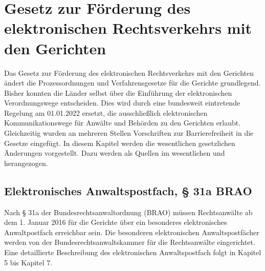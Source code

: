 \section{Gesetz zur Förderung des elektronischen Rechtsverkehrs mit den Gerichten}
Das Gesetz zur Förderung des elektronischen Rechtsverkehrs mit den Gerichten ändert die Prozessordnungen und Verfahrensgesetze für die Gerichte grundlegend. Bisher konnten die Länder selbst über die Einführung der elektronischen Verordnungswege entscheiden. Dies wird durch eine bundesweit eintretende Regelung am 01.01.2022 ersetzt, die ausschließlich elektronischen Kommunikationswege für Anwälte und Behörden zu den Gerichten erlaubt. Gleichzeitig wurden an mehreren Stellen Vorschriften zur Barrierefreiheit in die Gesetze eingefügt. In diesem Kapitel werden die wesentlichen gesetzlichen Änderungen vorgestellt. Dazu werden als Quellen im wesentlichen \textcite{Gesetzfoerderungrechtsverkehr} und \textcite{carstens2015grundlagen} herangezogen.
\subsection{Elektronisches Anwaltspostfach, § 31a BRAO}
Nach § 31a der Bundesrechtsanwaltordnung (BRAO) müssen Rechtsanwälte ab dem 1. Januar 2016 für die Gerichte über ein besonderes elektronisches Anwaltpostfach erreichbar sein. Die besonderen elektronischen Anwaltspostfächer werden von der Bundesrechtsanwaltskammer für die Rechtsanwälte eingerichtet. Eine detaillierte Beschreibung des elektronischen Anwaltspostfach folgt in Kapitel 5 bis Kapitel 7.
